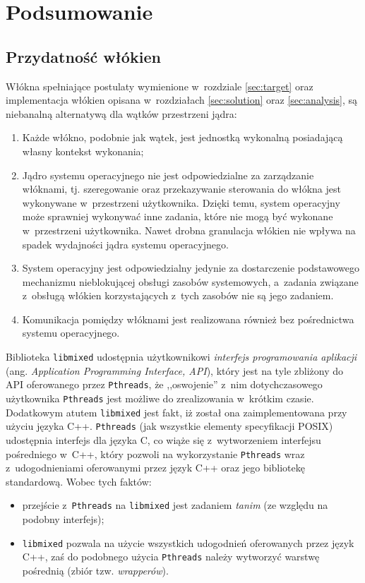 \documentclass[12pt]{mwart}
\newcommand{\code}{\texttt}
\begin{document}
\section{Podsumowanie}
\label{sec:summary}
\subsection{Przydatność włókien}
\indent
  Włókna spełniające postulaty wymienione w~rozdziale \ref{sec:target} oraz implementacja włókien opisana w~rozdziałach
  \ref{sec:solution} oraz \ref{sec:analysis}, są niebanalną alternatywą dla wątków przestrzeni jądra:
  \begin{enumerate}
    \item Każde włókno, podobnie jak wątek, jest jednostką wykonalną posiadającą własny kontekst wykonania;
    \item Jądro systemu operacyjnego nie jest odpowiedzialne za zarządzanie włóknami, tj. szeregowanie oraz przekazywanie sterowania
      do włókna jest wykonywane w~przestrzeni użytkownika. Dzięki temu, system operacyjny może sprawniej wykonywać inne zadania,
      które nie mogą być wykonane w~przestrzeni użytkownika. Nawet drobna granulacja włókien 
      nie wpływa na spadek wydajności jądra systemu operacyjnego.
    \item System operacyjny jest odpowiedzialny jedynie za dostarczenie podstawowego mechanizmu nieblokującej obsługi
      zasobów systemowych, a~zadania związane z~obsługą włókien korzystających z~tych zasobów nie są jego zadaniem.
    \item Komunikacja pomiędzy włóknami jest realizowana również bez pośrednictwa systemu operacyjnego.
  \end{enumerate}
\par
\indent
  Biblioteka \code{libmixed} udostępnia użytkownikowi \emph{interfejs programowania aplikacji} (ang. \emph{Application Programming Interface, API}),
  który jest na tyle zbliżony do API oferowanego przez \code{Pthreads}, że ,,oswojenie'' z~nim dotychczasowego użytkownika \code{Pthreads}
  jest możliwe do zrealizowania w~krótkim czasie. Dodatkowym atutem \code{libmixed} jest fakt, iż został ona zaimplementowana przy użyciu języka C++.
  \code{Pthreads} (jak wszystkie elementy specyfikacji POSIX) udostępnia interfejs dla języka C, co wiąże się z~wytworzeniem interfejsu pośredniego w~C++,
  który pozwoli na wykorzystanie \code{Pthreads} wraz z~udogodnieniami oferowanymi przez język C++ oraz jego bibliotekę standardową.
  Wobec tych faktów:
  \begin{itemize}
    \item przejście z~\code{Pthreads} na \code{libmixed} jest zadaniem \emph{tanim} (ze względu na podobny interfejs);
    \item \code{libmixed} pozwala na użycie wszystkich udogodnień oferowanych przez język C++, zaś do podobnego użycia \code{Pthreads}
      należy wytworzyć warstwę pośrednią (zbiór tzw. \emph{wrapperów}).
  \end{itemize}
\par
\end{document}
